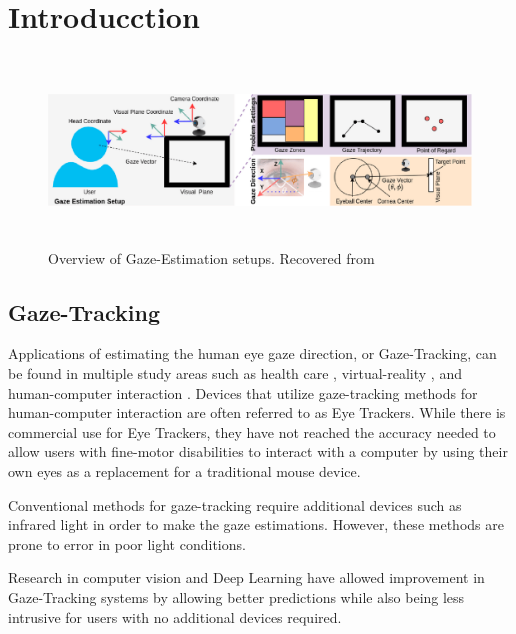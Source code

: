 
\chapter{Introducction}
\label{Chap1}

\begin{figure}
    \centering
    \includegraphics[width=\textwidth,height=5cm]{img/figures/gaze_estimation_setup.png}
    \caption{Overview of Gaze-Estimation setups. Recovered from \cite{survey_automatic_gaze_ghosh}}
    \label{gaze_estimation_setup}
 \end{figure}


\section{Gaze-Tracking}
Applications of estimating the human eye gaze direction, or Gaze-Tracking, can be found in multiple study areas such as health care \cite{EyeTrackMedical}, virtual-reality \cite{EyeVR}, and human-computer interaction \cite{Gaze-Controlled-Web}. Devices that utilize gaze-tracking methods for human-computer interaction are often referred to as Eye Trackers. While there is commercial use for Eye Trackers, they have not reached the accuracy needed to allow users with fine-motor disabilities to interact with a computer by using their own eyes as a replacement for a traditional mouse device.

Conventional methods for gaze-tracking require additional devices such as infrared light in order to make the gaze estimations. However, these methods are prone to error in poor light conditions.

Research in computer vision and Deep Learning have allowed improvement in Gaze-Tracking systems by allowing better predictions while also being less intrusive for users with no additional devices required.



